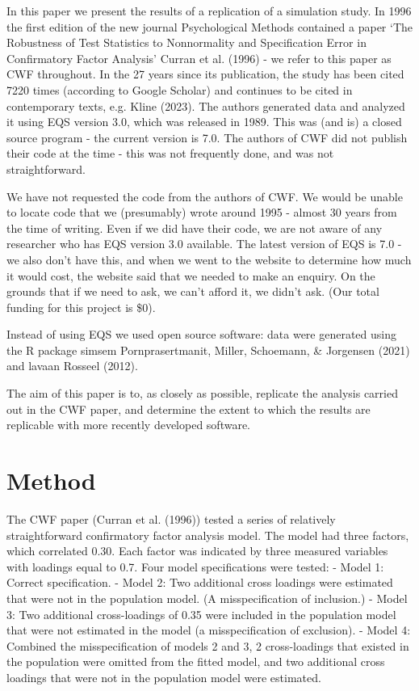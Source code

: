 \documentclass[
  letterpaper,
  DIV=11,
  numbers=noendperiod]{scrartcl}
\begin{document}
In this paper we present the results of a replication of a simulation
study. In 1996 the first edition of the new journal Psychological
Methods contained a paper `The Robustness of Test Statistics to
Nonnormality and Specification Error in Confirmatory Factor Analysis'
Curran et al. (1996) - we refer to this paper as CWF throughout. In the
27 years since its publication, the study has been cited 7220 times
(according to Google Scholar) and continues to be cited in contemporary
texts, e.g. Kline (2023). The authors generated data and analyzed it
using EQS version 3.0, which was released in 1989. This was (and is) a
closed source program - the current version is 7.0. The authors of CWF
did not publish their code at the time - this was not frequently done,
and was not straightforward.

We have not requested the code from the authors of CWF. We would be
unable to locate code that we (presumably) wrote around 1995 - almost 30
years from the time of writing. Even if we did have their code, we are
not aware of any researcher who has EQS version 3.0 available. The
latest version of EQS is 7.0 - we also don't have this, and when we went
to the website to determine how much it would cost, the website said
that we needed to make an enquiry. On the grounds that if we need to
ask, we can't afford it, we didn't ask. (Our total funding for this
project is \$0).

Instead of using EQS we used open source software: data were generated
using the R package simsem Pornprasertmanit, Miller, Schoemann, \&
Jorgensen (2021) and lavaan Rosseel (2012).

The aim of this paper is to, as closely as possible, replicate the
analysis carried out in the CWF paper, and determine the extent to which
the results are replicable with more recently developed software.

\section{Method}\label{method}

The CWF paper (Curran et al. (1996)) tested a series of relatively
straightforward confirmatory factor analysis model. The model had three
factors, which correlated 0.30. Each factor was indicated by three
measured variables with loadings equal to 0.7. Four model specifications
were tested: - Model 1: Correct specification. - Model 2: Two additional
cross loadings were estimated that were not in the population model. (A
misspecification of inclusion.) - Model 3: Two additional cross-loadings
of 0.35 were included in the population model that were not estimated in
the model (a misspecification of exclusion). - Model 4: Combined the
misspecification of models 2 and 3, 2 cross-loadings that existed in the
population were omitted from the fitted model, and two additional cross
loadings that were not in the population model were estimated.
\end{document}
